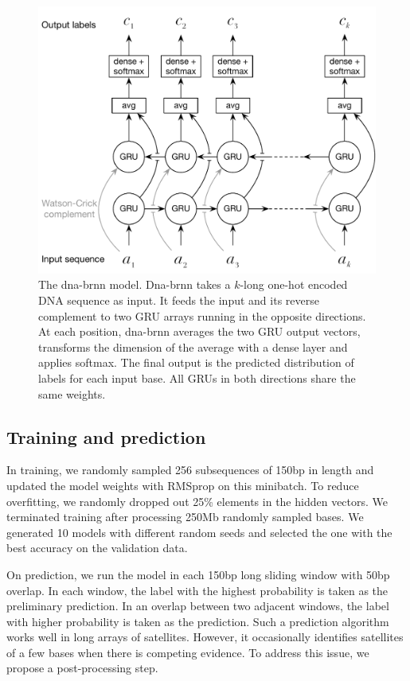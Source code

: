 \documentclass{bioinfo}
\begin{document}
\begin{methods}
\begin{figure}[tb]
\centering
\includegraphics[width=.45\textwidth]{dna-nn-fig}
\caption{The dna-brnn model. Dna-brnn takes a $k$-long one-hot encoded DNA
sequence as input. It feeds the input and its reverse complement to two GRU
arrays running in the opposite directions. At each
position, dna-brnn averages the two GRU output vectors, transforms the
dimension of the average with a dense layer and applies softmax. The final
output is the predicted distribution of labels for each input base. All GRUs in
both directions share the same weights.}\label{fig:model}
\end{figure}

\subsection{Training and prediction}

In training, we randomly sampled 256 subsequences of 150bp in length and updated
the model weights with RMSprop on this minibatch. To reduce overfitting, we
randomly dropped out 25\% elements in the hidden vectors. We terminated
training after processing 250Mb randomly sampled bases. We generated 10 models
with different random seeds and selected the one with the best accuracy on the
validation data.

On prediction, we run the model in each 150bp long sliding window with 50bp
overlap. In each window, the label with the highest probability is taken as the
preliminary prediction. In an overlap between two adjacent windows, the label
with higher probability is taken as the prediction. Such a prediction
algorithm works well in long arrays of satellites. However, it occasionally
identifies satellites of a few bases when there is competing evidence. To
address this issue, we propose a post-processing step.


\end{methods}
\end{document}
